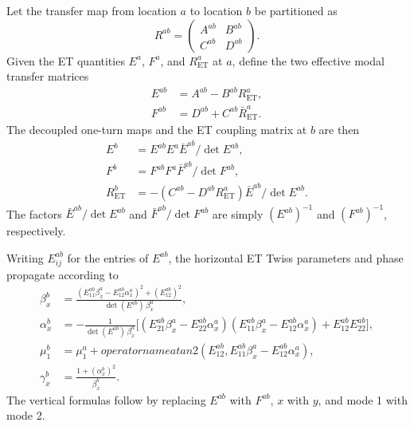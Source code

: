 Let the transfer map from location $a$ to location $b$ be partitioned as
\begin{equation}
 R^{ab}=
 \begin{pmatrix}
  A^{ab}&B^{ab}\\C^{ab}&D^{ab}
 \end{pmatrix}.
 \label{eq:Rab-blocks}
\end{equation}
Given the ET quantities $E^a$, $F^a$, and $R_{\mathrm{ET}}^a$ at $a$, define
the two effective modal transfer matrices
\begin{align}
 E^{ab}&=A^{ab}-B^{ab}R_{\mathrm{ET}}^a,
 \label{eq:Eab-definition}\\
 F^{ab}&=D^{ab}+C^{ab}\bar R_{\mathrm{ET}}^a.
 \label{eq:Fab-definition}
\end{align}
The decoupled one-turn maps and the ET coupling matrix at $b$ are then
\begin{align}
 E^b
 &=E^{ab}E^a\bar E^{ab}/\det E^{ab},
 \label{eq:E-propagation}\\
 F^b
 &=F^{ab}F^a\bar F^{ab}/\det F^{ab},
 \label{eq:F-propagation}\\
 R_{\mathrm{ET}}^b
 &=-\left(C^{ab}-D^{ab}R_{\mathrm{ET}}^a\right)
   \bar E^{ab}/\det E^{ab}.
 \label{eq:ret-propagation}
\end{align}
The factors $\bar E^{ab}/\det E^{ab}$ and
$\bar F^{ab}/\det F^{ab}$ are simply $(E^{ab})^{-1}$ and
$(F^{ab})^{-1}$, respectively.

Writing $E^{ab}_{ij}$ for the entries of $E^{ab}$, the horizontal ET Twiss
parameters and phase propagate according to
\begin{align}
 \beta_x^b
 &=\frac{
   \left(E^{ab}_{11}\beta_x^a-E^{ab}_{12}\alpha_x^a\right)^2
   +\left(E^{ab}_{12}\right)^2
  }{\det(E^{ab})\,\beta_x^a},
 \label{eq:et-beta-propagation}\\
 \alpha_x^b
 &=-\frac{1}{\det(E^{ab})\,\beta_x^a}
 \Big[
  \left(E^{ab}_{21}\beta_x^a-E^{ab}_{22}\alpha_x^a\right)
  \left(E^{ab}_{11}\beta_x^a-E^{ab}_{12}\alpha_x^a\right)
  +E^{ab}_{12}E^{ab}_{22}
 \Big],
 \label{eq:et-alpha-propagation}\\
 \mu_1^b
 &=\mu_1^a+operatorname{atan2}\!\left(
  E^{ab}_{12},
  E^{ab}_{11}\beta_x^a-E^{ab}_{12}\alpha_x^a
 \right),
 \label{eq:et-mu-propagation}\\
 \gamma_x^b&=\frac{1+(\alpha_x^b)^2}{\beta_x^b}.
 \label{eq:et-gamma-propagation}
\end{align}
The vertical formulas follow by replacing $E^{ab}$ with $F^{ab}$,
$x$ with $y$, and mode 1 with mode 2.

